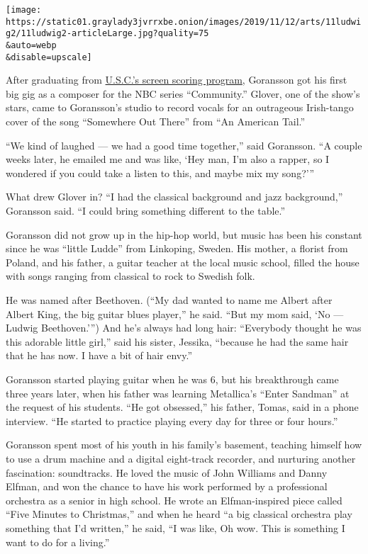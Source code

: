\texttt{[image: https://static01.graylady3jvrrxbe.onion/images/2019/11/12/arts/11ludwig2/11ludwig2-articleLarge.jpg?quality=75\\\&auto=webp\\\&disable=upscale]}

After graduating from
\href{https://music.usc.edu/departments/scoring/}{U.S.C.'s screen
scoring program}, Goransson got his first big gig as a composer for the
NBC series ``Community.'' Glover, one of the show's stars, came to
Goransson's studio to record vocals for an outrageous Irish-tango cover
of the song ``Somewhere Out There'' from ``An American Tail.''

``We kind of laughed --- we had a good time together,'' said Goransson.
``A couple weeks later, he emailed me and was like, `Hey man, I'm also a
rapper, so I wondered if you could take a listen to this, and maybe mix
my song?'''

What drew Glover in? ``I had the classical background and jazz
background,'' Goransson said. ``I could bring something different to the
table.''

Goransson did not grow up in the hip-hop world, but music has been his
constant since he was ``little Ludde'' from Linkoping, Sweden. His
mother, a florist from Poland, and his father, a guitar teacher at the
local music school, filled the house with songs ranging from classical
to rock to Swedish folk.

He was named after Beethoven. (``My dad wanted to name me Albert after
Albert King, the big guitar blues player,'' he said. ``But my mom said,
`No --- Ludwig Beethoven.''') And he's always had long hair: ``Everybody
thought he was this adorable little girl,'' said his sister, Jessika,
``because he had the same hair that he has now. I have a bit of hair
envy.''

Goransson started playing guitar when he was 6, but his breakthrough
came three years later, when his father was learning Metallica's ``Enter
Sandman'' at the request of his students. ``He got obsessed,'' his
father, Tomas, said in a phone interview. ``He started to practice
playing every day for three or four hours.''

Goransson spent most of his youth in his family's basement, teaching
himself how to use a drum machine and a digital eight-track recorder,
and nurturing another fascination: soundtracks. He loved the music of
John Williams and Danny Elfman, and won the chance to have his work
performed by a professional orchestra as a senior in high school. He
wrote an Elfman-inspired piece called ``Five Minutes to Christmas,'' and
when he heard ``a big classical orchestra play something that I'd
written,'' he said, ``I was like, Oh wow. This is something I want to do
for a living.''

